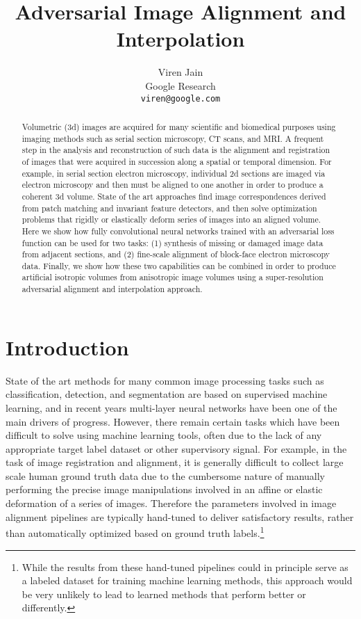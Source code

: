 \documentclass{article} %
\title{Adversarial Image Alignment and Interpolation}
\author{
Viren Jain \\
Google Research\\
\texttt{viren@google.com} \\
}
\begin{document}
\maketitle

\begin{abstract}
Volumetric (3d) images are acquired for many scientific and biomedical purposes using imaging methods such as serial section microscopy, CT scans, and MRI. A frequent step in the analysis and reconstruction of such data is the alignment and registration of images that were acquired in succession along a spatial or temporal dimension. For example, in serial section electron microscopy, individual 2d sections are imaged via electron microscopy and then must be aligned to one another in order to produce a coherent 3d volume. State of the art approaches find image correspondences derived from patch matching and invariant feature detectors, and then solve optimization problems that rigidly or elastically deform series of images into an aligned volume. Here we show how fully convolutional neural networks trained with an adversarial loss function can be used for two tasks: (1) synthesis of missing or damaged image data from adjacent sections, and (2) fine-scale alignment of block-face electron microscopy data. Finally, we show how these two capabilities can be combined in order to produce artificial isotropic volumes from anisotropic image volumes using a super-resolution adversarial alignment and interpolation approach. 
\end{abstract}

\section{Introduction}

State of the art methods for many common image processing tasks such as classification, detection, and segmentation are based on supervised machine learning, and in recent years multi-layer neural networks have been one of the main drivers of progress. However, there remain certain tasks which have been difficult to solve using machine learning tools, often due to the lack of any appropriate target label dataset or other supervisory signal. For example, in the task of image registration and alignment, it is generally difficult to collect large scale human ground truth data due to the cumbersome nature of manually performing the precise image manipulations involved in an affine or elastic deformation of a series of images. Therefore the parameters involved in image alignment pipelines are typically hand-tuned to deliver satisfactory results, rather than automatically optimized based on ground truth labels.\footnote{While the results from these hand-tuned pipelines could in principle serve as a labeled dataset for training machine learning methods, this approach would be very unlikely to lead to learned methods that perform better or differently.}
\end{document}
